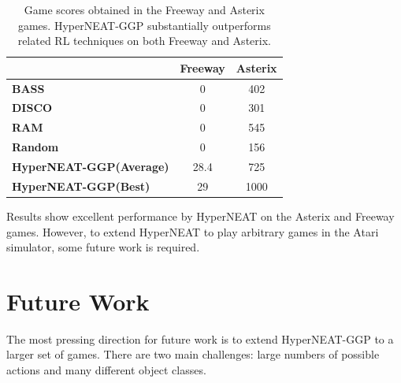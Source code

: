 \documentclass{acm_proc_article-sp}
\begin{document}

\begin{table}
\begin{center}
\begin{tabular}{|l|c|c|}
\hline
~ & \textbf{Freeway} & \textbf{Asterix} \\ \hline
\textbf{BASS} & 0 & 402 \\ \hline
\textbf{DISCO} & 0 & 301 \\ \hline
\textbf{RAM} & 0 & 545 \\ \hline
\textbf{Random} & 0 & 156 \\ \hline
\textbf{HyperNEAT-GGP(Average)} & 28.4 & 725 \\ \hline
\textbf{HyperNEAT-GGP(Best)} & 29 & 1000 \\ 
\hline
\end{tabular}
\end{center}
\label{tab:results-table}
\caption{Game scores obtained in the Freeway and Asterix games. HyperNEAT-GGP substantially outperforms related RL techniques on both Freeway and Asterix.}
\end{table}

Results show excellent performance by HyperNEAT on the Asterix and Freeway games. However, to extend HyperNEAT to play arbitrary games in the Atari simulator, some future work is required.

\section{Future Work}
\label{sec:futurework}
The most pressing direction for future work is to extend HyperNEAT-GGP to a larger set of games. There are two main challenges: large numbers of possible actions and many different object classes.
\end{document}
